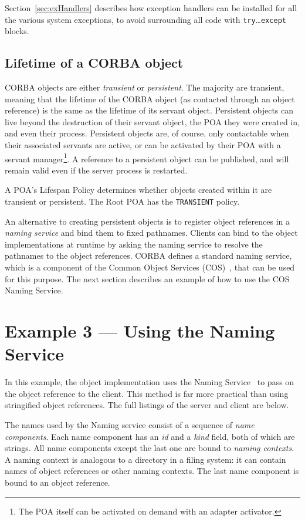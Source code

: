 \documentclass[11pt,oneside,a4paper]{book}
\newcommand{\code}[1]{\texttt{#1}}
\newcommand{\term}[1]{\textit{#1}}
\begin{document}
Section~\ref{sec:exHandlers} describes how exception handlers can be
installed for all the various system exceptions, to avoid surrounding
all code with \code{try}\dots\code{except} blocks.


\subsection{Lifetime of a CORBA object}

CORBA objects are either \term{transient} or \term{persistent}. The
majority are transient, meaning that the lifetime of the CORBA object
(as contacted through an object reference) is the same as the lifetime
of its servant object. Persistent objects can live beyond the
destruction of their servant object, the POA they were created in, and
even their process. Persistent objects are, of course, only
contactable when their associated servants are active, or can be
activated by their POA with a servant manager\footnote{The POA itself
can be activated on demand with an adapter activator.}. A reference to
a persistent object can be published, and will remain valid even if
the server process is restarted.

A POA's Lifespan Policy determines whether objects created within it
are transient or persistent. The Root POA has the \code{TRANSIENT}
policy.

An alternative to creating persistent objects is to register object
references in a \term{naming service} and bind them to fixed
pathnames. Clients can bind to the object implementations at runtime
by asking the naming service to resolve the pathnames to the object
references. CORBA defines a standard naming service, which is a
component of the Common Object Services (COS)~\cite{corbaservices},
that can be used for this purpose. The next section describes an
example of how to use the COS Naming Service.



\section{Example 3 --- Using the Naming Service}
\label{sec:usingNS}

In this example, the object implementation uses the Naming
Service~\cite{corbaservices} to pass on the object reference to the
client.  This method is far more practical than using stringified
object references. The full listings of the server and client are
below.

The names used by the Naming service consist of a sequence of
\term{name components}. Each name component has an \term{id} and a
\term{kind} field, both of which are strings. All name components
except the last one are bound to \term{naming contexts}. A naming
context is analogous to a directory in a filing system: it can contain
names of object references or other naming contexts. The last name
component is bound to an object reference.
\end{document}
